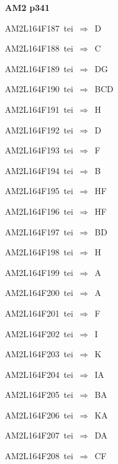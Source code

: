 \par\vfill\eject
{\bf\hfill AM2 p341\hfill\hbox{}}\par\bigskip
{\sixrm AM2L164F187\ {\sixit tei}\ }$\Rightarrow$\ D\par\smallskip
{\sixrm AM2L164F188\ {\sixit tei}\ }$\Rightarrow$\ C\par\smallskip
{\sixrm AM2L164F189\ {\sixit tei}\ }$\Rightarrow$\ DG\par\smallskip
{\sixrm AM2L164F190\ {\sixit tei}\ }$\Rightarrow$\ BCD\par\smallskip
{\sixrm AM2L164F191\ {\sixit tei}\ }$\Rightarrow$\ H\par\smallskip
{\sixrm AM2L164F192\ {\sixit tei}\ }$\Rightarrow$\ D\par\smallskip
{\sixrm AM2L164F193\ {\sixit tei}\ }$\Rightarrow$\ F\par\smallskip
{\sixrm AM2L164F194\ {\sixit tei}\ }$\Rightarrow$\ B\par\smallskip
{\sixrm AM2L164F195\ {\sixit tei}\ }$\Rightarrow$\ HF\par\smallskip
{\sixrm AM2L164F196\ {\sixit tei}\ }$\Rightarrow$\ HF\par\smallskip
{\sixrm AM2L164F197\ {\sixit tei}\ }$\Rightarrow$\ BD\par\smallskip
{\sixrm AM2L164F198\ {\sixit tei}\ }$\Rightarrow$\ H\par\smallskip
{\sixrm AM2L164F199\ {\sixit tei}\ }$\Rightarrow$\ A\par\smallskip
{\sixrm AM2L164F200\ {\sixit tei}\ }$\Rightarrow$\ A\par\smallskip
{\sixrm AM2L164F201\ {\sixit tei}\ }$\Rightarrow$\ F\par\smallskip
{\sixrm AM2L164F202\ {\sixit tei}\ }$\Rightarrow$\ I\par\smallskip
{\sixrm AM2L164F203\ {\sixit tei}\ }$\Rightarrow$\ K\par\smallskip
{\sixrm AM2L164F204\ {\sixit tei}\ }$\Rightarrow$\ IA\par\smallskip
{\sixrm AM2L164F205\ {\sixit tei}\ }$\Rightarrow$\ BA\par\smallskip
{\sixrm AM2L164F206\ {\sixit tei}\ }$\Rightarrow$\ KA\par\smallskip
{\sixrm AM2L164F207\ {\sixit tei}\ }$\Rightarrow$\ DA\par\smallskip
{\sixrm AM2L164F208\ {\sixit tei}\ }$\Rightarrow$\ CF\par\smallskip

